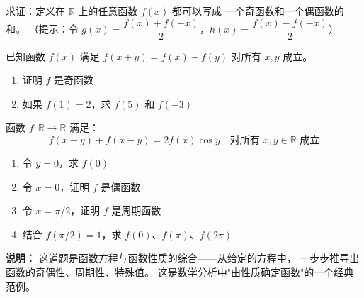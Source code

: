 \begin{exercise}[6]
求证：定义在 \(\mathbb{R}\) 上的任意函数 \(f(x)\) 都可以写成
一个奇函数和一个偶函数的和。
（提示：令 \(g(x) = \dfrac{f(x) + f(-x)}{2}\)，\(h(x) = \dfrac{f(x) - f(-x)}{2}\)）
\end{exercise}

\begin{exercise}[6]
已知函数 \(f(x)\) 满足 \(f(x + y) = f(x) + f(y)\) 对所有 \(x, y\) 成立。
\begin{enumerate}
  \item[(1)] 证明 \(f\) 是奇函数
  \item[(2)] 如果 \(f(1) = 2\)，求 \(f(5)\) 和 \(f(-3)\)
\end{enumerate}
\end{exercise}


\begin{exercise}[7]
函数 \(f: \mathbb{R} \to \mathbb{R}\) 满足：
\[
f(x + y) + f(x - y) = 2f(x)\cos y \quad \text{对所有 } x, y \in \mathbb{R} \text{ 成立}
\]
\begin{enumerate}
  \item[(1)] 令 \(y = 0\)，求 \(f(0)\)
  \item[(2)] 令 \(x = 0\)，证明 \(f\) 是偶函数
  \item[(3)] 令 \(x = \pi/2\)，证明 \(f\) 是周期函数
  \item[(4)] 结合 \(f(\pi/2) = 1\)，求 \(f(0)\)、\(f(\pi)\)、\(f(2\pi)\)
\end{enumerate}

\textbf{说明：} 这道题是函数方程与函数性质的综合——从给定的方程中，
一步步推导出函数的奇偶性、周期性、特殊值。
这是数学分析中"由性质确定函数"的一个经典范例。
\end{exercise}
